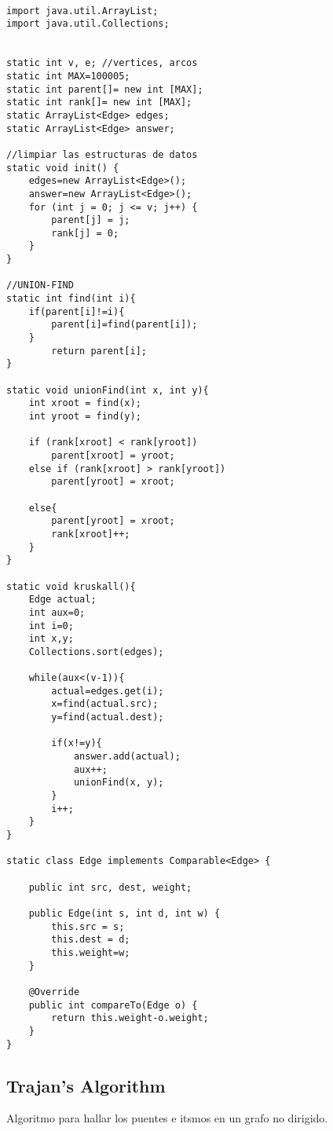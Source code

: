 \documentclass[11pt,letterpaper,twocolumn,twosided]{article}
\begin{document}
\begin{lstlisting}

import java.util.ArrayList;
import java.util.Collections;


static int v, e; //vertices, arcos
static int MAX=100005;     
static int parent[]= new int [MAX];
static int rank[]= new int [MAX]; 
static ArrayList<Edge> edges;
static ArrayList<Edge> answer;

//limpiar las estructuras de datos    
static void init() {
    edges=new ArrayList<Edge>();
    answer=new ArrayList<Edge>();
    for (int j = 0; j <= v; j++) {
        parent[j] = j;
        rank[j] = 0;
    }
}

//UNION-FIND   
static int find(int i){
    if(parent[i]!=i){
        parent[i]=find(parent[i]);
    }
        return parent[i];
}

static void unionFind(int x, int y){
    int xroot = find(x);
    int yroot = find(y);
     
    if (rank[xroot] < rank[yroot])
        parent[xroot] = yroot;
    else if (rank[xroot] > rank[yroot])
        parent[yroot] = xroot;
     
    else{
        parent[yroot] = xroot;
        rank[xroot]++;
    }
}

static void kruskall(){
    Edge actual;
    int aux=0;
    int i=0;
    int x,y;
    Collections.sort(edges);
        
    while(aux<(v-1)){
        actual=edges.get(i);
        x=find(actual.src);
        y=find(actual.dest);

        if(x!=y){
            answer.add(actual);
            aux++;
            unionFind(x, y);
        }
        i++;
    }
}

static class Edge implements Comparable<Edge> {

    public int src, dest, weight;
    
    public Edge(int s, int d, int w) {
        this.src = s;
        this.dest = d;
        this.weight=w;
    }
    
    @Override
    public int compareTo(Edge o) {
        return this.weight-o.weight;
    }
}
\end{lstlisting}

\subsection{Trajan's Algorithm}
Algoritmo para hallar los puentes e itsmos en un grafo no dirigido.
\end{document}
